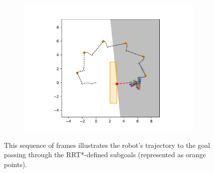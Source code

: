 \begin{figure}[H]
\begin{subfigure}{0.20\textwidth}
        \includegraphics[width=\textwidth]{figures/Simulations/sim_rrt/frame_9.pdf}
    \end{subfigure}
    
    \caption[short]{This sequence of frames illustrates the robot's trajectory to the goal passing through the RRT*-defined subgoals (represented as orange points).}
    \label{fig:sim_rrt_frames}
\end{figure}

